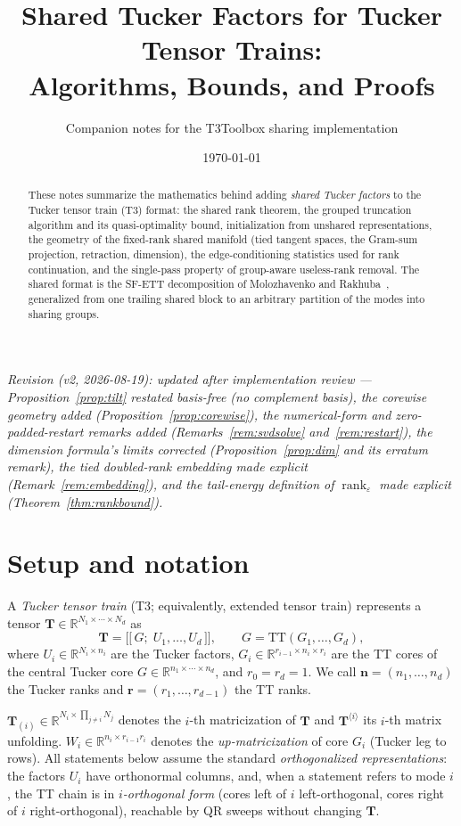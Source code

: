 \documentclass[11pt]{article}
\title{Shared Tucker Factors for Tucker Tensor Trains:\\
Algorithms, Bounds, and Proofs}
\author{Companion notes for the T3Toolbox sharing implementation}
\date{\today}
\theoremstyle{definition}
\theoremstyle{remark}
\newcommand{\R}{\mathbb{R}}
\newcommand{\T}{\boldsymbol{T}}
\newcommand{\rank}{\operatorname{rank}}
\begin{document}
\maketitle

\begin{abstract}
\noindent
These notes summarize the mathematics behind adding \emph{shared Tucker
factors} to the Tucker tensor train (T3) format: the shared rank theorem, the
grouped truncation algorithm and its quasi-optimality bound, initialization
from unshared representations, the geometry of the fixed-rank shared manifold
(tied tangent spaces, the Gram-sum projection, retraction, dimension), the
edge-conditioning statistics used for rank continuation, and the single-pass
property of group-aware useless-rank removal. The shared format is the SF-ETT
decomposition of Molozhavenko and Rakhuba~\cite{MR2026}, generalized from one
trailing shared block to an arbitrary partition of the modes into sharing
groups.
\end{abstract}

\noindent\emph{Revision (v2, 2026-08-19): updated after implementation review
--- Proposition~\ref{prop:tilt} restated basis-free (no complement basis),
the corewise geometry added (Proposition~\ref{prop:corewise}), the
numerical-form and zero-padded-restart remarks added
(Remarks~\ref{rem:svdsolve} and~\ref{rem:restart}), the dimension formula's
limits corrected (Proposition~\ref{prop:dim} and its erratum remark), the
tied doubled-rank embedding made explicit (Remark~\ref{rem:embedding}), and
the tail-energy definition of $\rank_\varepsilon$ made explicit
(Theorem~\ref{thm:rankbound}).}

\section{Setup and notation}\label{sec:setup}

A \emph{Tucker tensor train} (T3; equivalently, extended tensor train)
represents a tensor $\T \in \R^{N_1 \times \cdots \times N_d}$ as
\[
\T = \bigl[\bigl[\, G ;\; U_1, \ldots, U_d \,\bigr]\bigr],
\qquad
G = \mathrm{TT}(G_1, \ldots, G_d),
\]
where $U_i \in \R^{N_i \times n_i}$ are the Tucker factors,
$G_i \in \R^{r_{i-1} \times n_i \times r_i}$ are the TT cores of the central
Tucker core $G \in \R^{n_1 \times \cdots \times n_d}$, and
$r_0 = r_d = 1$. We call $\boldsymbol{n} = (n_1,\ldots,n_d)$ the Tucker ranks
and $\boldsymbol{r} = (r_1,\ldots,r_{d-1})$ the TT ranks.

$\T_{(i)} \in \R^{N_i \times \prod_{j\neq i} N_j}$ denotes the $i$-th
matricization of $\T$ and $\T^{\langle i \rangle}$ its $i$-th matrix
unfolding. $W_i \in \R^{n_i \times r_{i-1} r_i}$ denotes the
\emph{up-matricization} of core $G_i$ (Tucker leg to rows). All statements
below assume the standard \emph{orthogonalized representations}: the factors
$U_i$ have orthonormal columns, and, when a statement refers to mode $i$, the
TT chain is in \emph{$i$-orthogonal form} (cores left of $i$ left-orthogonal,
cores right of $i$ right-orthogonal), reachable by QR sweeps without changing
$\T$.
\end{document}
